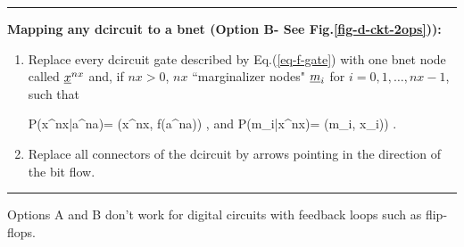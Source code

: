 \hrule\noindent
{\bf Mapping any
dcircuit to a bnet (Option B-
See Fig.\ref{fig-d-ckt-2ops})):}
\begin{enumerate}
\item
Replace every dcircuit  gate 
described by Eq.(\ref{eq-f-gate})
with
one bnet node called ${\underline{x}}^{nx}$
and, if $nx>0$, 
$nx$ ``marginalizer nodes" ${\underline{m}}_i$
for $i=0, 1, \ldots, nx-1$, such that

\beq\color{blue}
P(x^{nx}|a^{na})=
\delta(x^{nx}, f(a^{na}))
\;,
\eeq
and
\beq\color{blue}
P(m_i|x^{nx})=
\delta(m_i, x_i))
\;.
\eeq


\item
Replace
all connectors of the dcircuit
by arrows 
pointing in the direction
of the bit flow.



\end{enumerate}
\hrule 
Options A and B don't work
for digital circuits 
with feedback loops 
such as flip-flops.